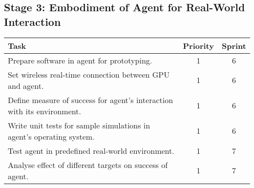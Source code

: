 \documentclass[a4paper,11pt]{article}
\begin{document}
\subsection{Stage 3: Embodiment of Agent for Real-World Interaction}
\begin{center}
    \begin{tabular}{p{12cm} c c}
    \textbf{Task} & \textbf{Priority} & \textbf{Sprint} \\ \hline
	Prepare software in agent for prototyping. & 1 & 6 \\
	Set wireless real-time connection between GPU and agent. & 1 & 6 \\
	Define measure of success for agent's interaction with its environment. & 1 & 6 \\
	Write unit tests for sample simulations in agent's operating system. & 1 & 6 \\
	Test agent in predefined real-world environment. & 1 & 7 \\
	Analyse effect of different targets on success of agent. & 1 & 7 \\
    \end{tabular}
\end{center}
\end{document}
